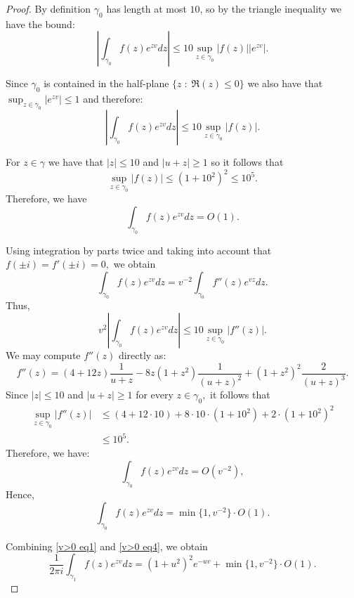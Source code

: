 \begin{proof}
        By definition $\gamma_0$ has length at most $10$, so by the triangle inequality we have the bound:
        \begin{equation*}
            \left|\int_{\gamma_0}f(z)e^{zv}dz\right| \leq 10\sup_{z\in\gamma_0} |f(z)||e^{zv}|.
        \end{equation*}
        
        Since $\gamma_0$ is contained in the half-plane $\{z\;:\;\Re(z) \leq 0\}$ we also have that $\sup_{z \in \gamma_0} |e^{zv}| \leq 1$
        and therefore:
        \begin{equation*}
            \left|\int_{\gamma_0}f(z)e^{zv}dz\right| \leq 10\sup_{z\in\gamma_0} |f(z)|.
        \end{equation*}
        
        For $z \in \gamma$ we have that $|z|\leq 10$ and $|u+z|\geq1$ so it follows that
        $$\sup_{z\in\gamma_0}|f(z)|\leq (1+10^2)^2\leq 10^5.$$
        Therefore, we have
        \begin{equation}\label{v>0 eq2}
            \int_{\gamma_0} f(z)e^{zv}dz =O(1).
        \end{equation}

        Using integration by parts twice and taking into account that $f(\pm i)=f'(\pm i)=0,$ we obtain
        $$\int_{\gamma_0}f(z)e^{zv}dz=v^{-2}\int_{\gamma_0}f''(z)e^{vz}dz.$$
        Thus,
        $$v^2\left|\int_{\gamma_0}f(z)e^{zv}dz\right| \leq 10\sup_{z\in\gamma_0}|f''(z)|.$$
        We may compute $f''(z)$ directly as:
        $$f''(z) = (4+12z)\frac1{u+z}-8z(1+z^2)\frac1{(u+z)^2}+(1+z^2)^2\frac2{(u+z)^3}.$$
        Since $|z|\leq 10$ and $|u+z|\geq1$ for every $z\in\gamma_0,$ it follows that
        \begin{align*}
            \sup_{z\in\gamma_0}|f''(z)| &\leq (4+12\cdot 10)+8\cdot 10\cdot (1+10^2)+2\cdot(1+10^2)^2\\
                                        &\leq 10^5.
        \end{align*}
        Therefore, we have:
        \begin{equation}\label{v>0 eq3}
            \int_{\gamma_0}f(z)e^{zv}dz=O(v^{-2}),
        \end{equation}
        Hence,
        \begin{equation}\label{v>0 eq4}
            \int_{\gamma_0}f(z)e^{zv}dz = \min\{1,v^{-2}\}\cdot O(1).
        \end{equation}
        
        Combining \eqref{v>0 eq1} and \eqref{v>0 eq4}, we obtain
        $$\frac1{2\pi i}\int_{\gamma_1}f(z)e^{zv}dz=(1+u^2)^2e^{-uv}+\min\{1,v^{-2}\}\cdot O(1).$$
                

\end{proof}
